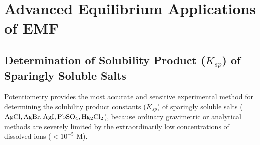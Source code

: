 \chapter{Advanced Equilibrium Applications of EMF}
\label{chap:equilibrium_applications}

\section{Determination of Solubility Product ($K_{sp}$) of Sparingly Soluble Salts}

Potentiometry provides the most accurate and sensitive experimental method for determining the solubility product constants ($K_{sp}$) of sparingly soluble salts ($\ce{AgCl}, \ce{AgBr}, \ce{AgI}, \ce{PbSO4}, \ce{Hg2Cl2}$), because ordinary gravimetric or analytical methods are severely limited by the extraordinarily low concentrations of dissolved ions ($< 10^{-5}\text{ M}$).

